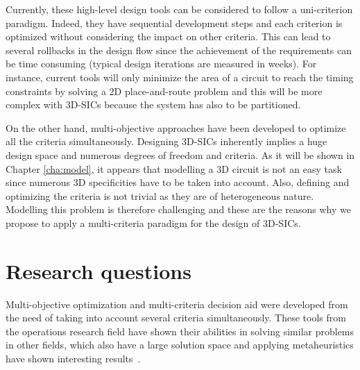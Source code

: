 Currently, these high-level design tools can be considered to follow a uni-criterion paradigm. Indeed, they have sequential development steps and each criterion is optimized without considering the impact on other criteria. This can lead to several rollbacks in the design flow since the achievement of the requirements can be time consuming (typical design iterations are measured in weeks). For instance, current tools will only minimize the area of a circuit to reach the timing constraints by solving a 2D place-and-route problem and this will be more complex with 3D-SICs because the system has also to be partitioned.

On the other hand, multi-objective approaches have been developed to optimize all the criteria simultaneously. Designing 3D-SICs inherently implies a huge design space and numerous degrees of freedom and criteria. As it will be shown in Chapter \ref{cha:model}, it appears that modelling a 3D circuit is not an easy task since numerous 3D specificities have to be taken into account. Also, defining and optimizing the criteria is not trivial as they are of heterogeneous nature. Modelling this problem is therefore challenging and these are the reasons why we propose to apply a multi-criteria paradigm for the design of 3D-SICs.

\section*{Research questions}
Multi-objective optimization and multi-criteria decision aid were developed from the need of taking into account several criteria simultaneously. These tools from the operations research field have shown their abilities in solving similar problems in other fields, which also have a large solution space and applying metaheuristics have shown interesting results~\cite{talbi09}.

